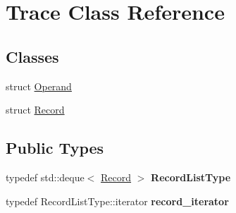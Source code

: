 \hypertarget{classTrace}{
\section{Trace Class Reference}
\label{classTrace}
}
\subsection*{Classes}
\begin{DoxyCompactItemize}
\item 
struct \hyperlink{structTrace_1_1Operand}{Operand}
\item 
struct \hyperlink{structTrace_1_1Record}{Record}
\end{DoxyCompactItemize}
\subsection*{Public Types}
\begin{DoxyCompactItemize}
\item 
\hypertarget{classTrace_aad12016da100049193ab3d80539d3d1d}{
typedef std::deque$<$ \hyperlink{structTrace_1_1Record}{Record} $>$ {\bfseries RecordListType}}
\label{classTrace_aad12016da100049193ab3d80539d3d1d}

\item 
\hypertarget{classTrace_a97298d04d58f7f9e9ae9c61bb233d338}{
typedef RecordListType::iterator {\bfseries record\_\-iterator}}
\label{classTrace_a97298d04d58f7f9e9ae9c61bb233d338}

\end{DoxyCompactItemize}
